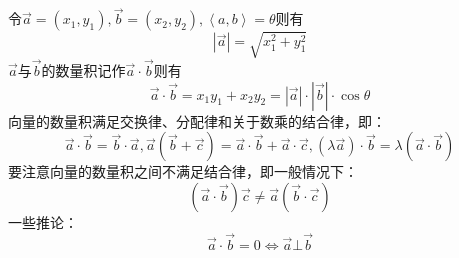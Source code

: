 令$\overrightarrow a  = \left( {{x_1},{y_1}} \right),\overrightarrow b  = \left( {{x_2},{y_2}} \right),\left\langle {a,b} \right\rangle  = \theta $则有
\begin{equation}
\left| {\overrightarrow a } \right| = \sqrt {x_1^2 + y_1^2}
\end{equation}
$\overrightarrow a$与$\overrightarrow b$的数量积记作$\overrightarrow a  \cdot \overrightarrow b $则有
\begin{equation}
\overrightarrow a  \cdot \overrightarrow b  = {x_1}{y_1} + {x_2}{y_2} = \left| {\overrightarrow a } \right| \cdot \left| {\overrightarrow b } \right| \cdot \cos \theta 
\end{equation}
向量的数量积满足交换律、分配律和关于数乘的结合律，即：
\begin{equation}
\overrightarrow a  \cdot \overrightarrow b  = \overrightarrow b  \cdot \overrightarrow a ,\overrightarrow a \left( {\overrightarrow b  + \overrightarrow c } \right) = \overrightarrow a  \cdot \overrightarrow b  + \overrightarrow a  \cdot \overrightarrow c ,\left( {\lambda \overrightarrow a } \right) \cdot \overrightarrow b  = \lambda \left( {\overrightarrow a  \cdot \overrightarrow b } \right)
\end{equation}
要注意向量的数量积之间不满足结合律，即一般情况下：
\begin{equation}
\left( {\overrightarrow a  \cdot \overrightarrow b } \right)\overrightarrow c  \ne \overrightarrow a \left( {\overrightarrow b  \cdot \overrightarrow c } \right)
\end{equation}
一些推论：
\begin{equation}
\overrightarrow a  \cdot \overrightarrow b  = 0 \Leftrightarrow \overrightarrow a  \bot \overrightarrow b 
\end{equation}